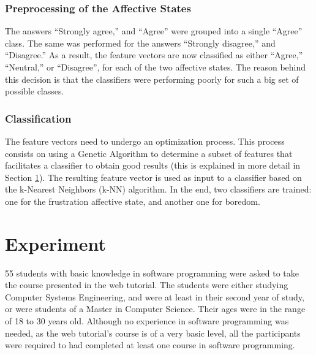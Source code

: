 \documentclass[runningheads,a4paper]{llncs}
\begin{document}

\subsubsection{Preprocessing of the Affective States}

The answers ``Strongly agree,'' and ``Agree'' were grouped into a single ``Agree'' class. The same was performed for the answers ``Strongly disagree,'' and ``Disagree.'' As a result, the feature vectors are now classified as either ``Agree,'' ``Neutral,'' or ``Disagree'', for each of the two affective states. The reason behind this decision is that the classifiers were performing poorly for such a big set of possible classes.

\subsubsection{Classification}

The feature vectors need to undergo an optimization process. This process consists on using a Genetic Algorithm to determine a subset of features that facilitates a classifier to obtain good results (this is explained in more detail in Section \ref{experiment}). The resulting feature vector is used as input to a classifier based on the k-Nearest Neighbors (k-NN) algorithm. In the end, two classifiers are trained: one for the frustration affective state, and another one for boredom.

\section{Experiment}
\label{experiment}

55 students with basic knowledge in software programming were asked to take the course presented in the web tutorial. The students were either studying Computer Systems Engineering, and were at least in their second year of study, or were students of a Master in Computer Science. Their ages were in the range of 18 to 30 years old. Although no experience in software programming was needed, as the web tutorial's course is of a very basic level, all the participants were required to had completed at least one course in software programming.
\end{document}
